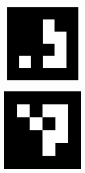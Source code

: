 \begin{figure}[htb]
\begin{minipage}[t]{0.33\linewidth}
		\label{fig:2-8d} 
	\end{minipage}
	\begin{minipage}[t]{0.33\linewidth} 
		\centering
		\includegraphics[width=\columnwidth]{figures/2-8e.png} 
		\label{fig:2-8e} 
	\end{minipage}
	\begin{minipage}[t]{0.33\linewidth} 
		\centering
		\includegraphics[width=\columnwidth]{figures/2-8f.png} 

\end{minipage}
\end{figure}
